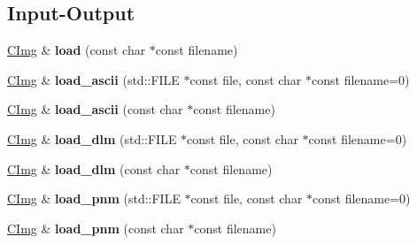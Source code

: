 \subsection*{Input-\/\-Output}
\begin{DoxyCompactItemize}
\item 
\hypertarget{structcimg__library_1_1_c_img_ac232288147b4167d8daca12e752de20a}{\hyperlink{structcimg__library_1_1_c_img}{C\-Img} \& {\bfseries load} (const char $\ast$const filename)}\label{structcimg__library_1_1_c_img_ac232288147b4167d8daca12e752de20a}

\item 
\hypertarget{structcimg__library_1_1_c_img_affd7ab580b1ab0cfa26a40b6af7fb86d}{\hyperlink{structcimg__library_1_1_c_img}{C\-Img} \& {\bfseries load\-\_\-ascii} (std\-::\-F\-I\-L\-E $\ast$const file, const char $\ast$const filename=0)}\label{structcimg__library_1_1_c_img_affd7ab580b1ab0cfa26a40b6af7fb86d}

\item 
\hypertarget{structcimg__library_1_1_c_img_af1dea28069ae9ee32a012132a5bb0c6b}{\hyperlink{structcimg__library_1_1_c_img}{C\-Img} \& {\bfseries load\-\_\-ascii} (const char $\ast$const filename)}\label{structcimg__library_1_1_c_img_af1dea28069ae9ee32a012132a5bb0c6b}

\item 
\hypertarget{structcimg__library_1_1_c_img_affed02ce9bac68896151e61de1cd1228}{\hyperlink{structcimg__library_1_1_c_img}{C\-Img} \& {\bfseries load\-\_\-dlm} (std\-::\-F\-I\-L\-E $\ast$const file, const char $\ast$const filename=0)}\label{structcimg__library_1_1_c_img_affed02ce9bac68896151e61de1cd1228}

\item 
\hypertarget{structcimg__library_1_1_c_img_a7c3741920165adcc8958207802e5dcd8}{\hyperlink{structcimg__library_1_1_c_img}{C\-Img} \& {\bfseries load\-\_\-dlm} (const char $\ast$const filename)}\label{structcimg__library_1_1_c_img_a7c3741920165adcc8958207802e5dcd8}

\item 
\hypertarget{structcimg__library_1_1_c_img_ac8adaddeddadebd69a6bb11e1a1d8e00}{\hyperlink{structcimg__library_1_1_c_img}{C\-Img} \& {\bfseries load\-\_\-pnm} (std\-::\-F\-I\-L\-E $\ast$const file, const char $\ast$const filename=0)}\label{structcimg__library_1_1_c_img_ac8adaddeddadebd69a6bb11e1a1d8e00}

\item 
\hypertarget{structcimg__library_1_1_c_img_ad965659f2570bce67e41088731ea378d}{\hyperlink{structcimg__library_1_1_c_img}{C\-Img} \& {\bfseries load\-\_\-pnm} (const char $\ast$const filename)}\label{structcimg__library_1_1_c_img_ad965659f2570bce67e41088731ea378d}


\end{DoxyCompactItemize}
